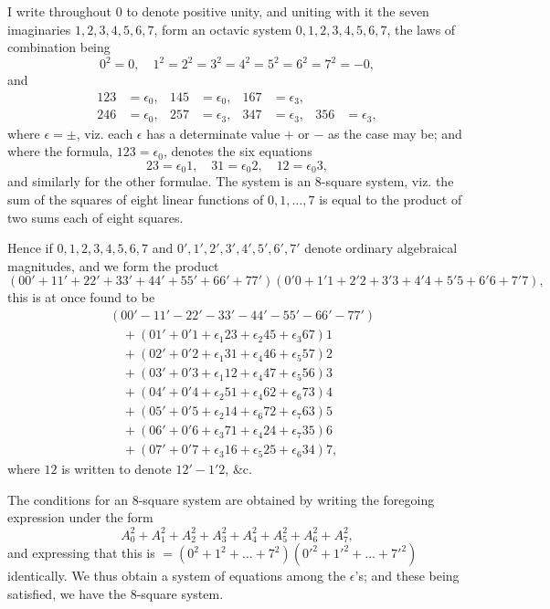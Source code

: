 \documentclass[11pt,a4paper]{book}
\begin{document}
I write throughout $0$ to denote positive unity, and uniting with it the seven imaginaries $1, 2, 3, 4, 5, 6, 7$, form an octavic system $0, 1, 2, 3, 4, 5, 6, 7$, the laws of combination being
\[
0^2 = 0,\quad 1^2 = 2^2 = 3^2 = 4^2 = 5^2 = 6^2 = 7^2 = -0,
\]
and
\[
\begin{aligned}
123 &= \epsilon_0, & 145 &= \epsilon_0, & 167 &= \epsilon_3,\\
246 &= \epsilon_0, & 257 &= \epsilon_3, & 347 &= \epsilon_3, & 356 &= \epsilon_3,
\end{aligned}
\]
where $\epsilon = \pm$, viz. each $\epsilon$ has a determinate value $+$ or $-$ as the case may be; and where the formula, $123 = \epsilon_0$, denotes the six equations
\[
23 = \epsilon_0 1,\quad 31 = \epsilon_0 2,\quad 12 = \epsilon_0 3,
\]
and similarly for the other formulae. The system is an 8-square system, viz. the sum of the squares of eight linear functions of $0, 1, \dots, 7$ is equal to the product of two sums each of eight squares.

Hence if $0, 1, 2, 3, 4, 5, 6, 7$ and $0', 1', 2', 3', 4', 5', 6', 7'$ denote ordinary algebraical magnitudes, and we form the product
\[
(00' + 11' + 22' + 33' + 44' + 55' + 66' + 77')(0'0 + 1'1 + 2'2 + 3'3 + 4'4 + 5'5 + 6'6 + 7'7),
\]
this is at once found to be
\[
\begin{aligned}
&(00' - 11' - 22' - 33' - 44' - 55' - 66' - 77')\\
&\quad + (01' + 0'1 + \epsilon_1 23 + \epsilon_2 45 + \epsilon_3 67)1\\
&\quad + (02' + 0'2 + \epsilon_1 31 + \epsilon_4 46 + \epsilon_5 57)2\\
&\quad + (03' + 0'3 + \epsilon_1 12 + \epsilon_4 47 + \epsilon_5 56)3\\
&\quad + (04' + 0'4 + \epsilon_2 51 + \epsilon_4 62 + \epsilon_6 73)4\\
&\quad + (05' + 0'5 + \epsilon_2 14 + \epsilon_6 72 + \epsilon_7 63)5\\
&\quad + (06' + 0'6 + \epsilon_3 71 + \epsilon_4 24 + \epsilon_7 35)6\\
&\quad + (07' + 0'7 + \epsilon_3 16 + \epsilon_5 25 + \epsilon_6 34)7,
\end{aligned}
\]
where $12$ is written to denote $12' - 1'2$, \&c.

The conditions for an 8-square system are obtained by writing the foregoing expression under the form
\[
A_0^2 + A_1^2 + A_2^2 + A_3^2 + A_4^2 + A_5^2 + A_6^2 + A_7^2,
\]
and expressing that this is $= (0^2 + 1^2 + \dots + 7^2)(0'^2 + 1'^2 + \dots + 7'^2)$ identically. We thus obtain a system of equations among the $\epsilon$'s; and these being satisfied, we have the 8-square system.
\end{document}
